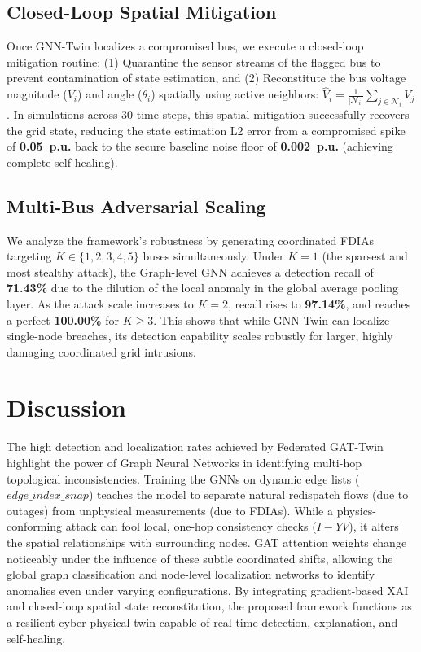 \documentclass[conference]{IEEEtran}
\begin{document}
\subsection{Closed-Loop Spatial Mitigation}
Once GNN-Twin localizes a compromised bus, we execute a closed-loop mitigation routine: (1) Quarantine the sensor streams of the flagged bus to prevent contamination of state estimation, and (2) Reconstitute the bus voltage magnitude ($V_i$) and angle ($\theta_i$) spatially using active neighbors: $\hat{V}_i = \frac{1}{|\mathcal{N}_i|} \sum_{j \in \mathcal{N}_i} V_j$. In simulations across 30 time steps, this spatial mitigation successfully recovers the grid state, reducing the state estimation L2 error from a compromised spike of \textbf{0.05~p.u.} back to the secure baseline noise floor of \textbf{0.002~p.u.} (achieving complete self-healing).

\subsection{Multi-Bus Adversarial Scaling}
We analyze the framework's robustness by generating coordinated FDIAs targeting $K \in \{1, 2, 3, 4, 5\}$ buses simultaneously. Under $K=1$ (the sparsest and most stealthy attack), the Graph-level GNN achieves a detection recall of \textbf{71.43\%} due to the dilution of the local anomaly in the global average pooling layer. As the attack scale increases to $K=2$, recall rises to \textbf{97.14\%}, and reaches a perfect \textbf{100.00\%} for $K \geq 3$. This shows that while GNN-Twin can localize single-node breaches, its detection capability scales robustly for larger, highly damaging coordinated grid intrusions.

\section{Discussion}\label{sec:discussion}
The high detection and localization rates achieved by Federated GAT-Twin highlight the power of Graph Neural Networks in identifying multi-hop topological inconsistencies. Training the GNNs on dynamic edge lists ($edge\_index\_snap$) teaches the model to separate natural redispatch flows (due to outages) from unphysical measurements (due to FDIAs). While a physics-conforming attack can fool local, one-hop consistency checks ($I - YV$), it alters the spatial relationships with surrounding nodes. GAT attention weights change noticeably under the influence of these subtle coordinated shifts, allowing the global graph classification and node-level localization networks to identify anomalies even under varying configurations. By integrating gradient-based XAI and closed-loop spatial state reconstitution, the proposed framework functions as a resilient cyber-physical twin capable of real-time detection, explanation, and self-healing.
\end{document}
